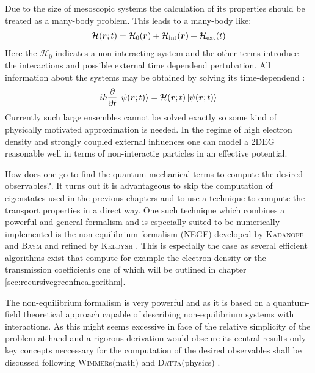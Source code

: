 Due to the size of mesoscopic systems the calculation of its properties should be treated as a many-body problem. This leads to a many-body \hamil{} like:
\begin{align}
\mathcal{H}(\boldsymbol{r};t) = \mathcal{H}_0(\boldsymbol{r}) + \mathcal{H}_{\text{int}}(\boldsymbol{r})+\mathcal{H}_{\text{ext}}(t)
\end{align}
Here the $\mathcal{H}_0$ indicates a non-interacting system and the other terms introduce the interactions and possible external time dependend pertubation. 
All information about the systems may be obtained by solving its time-dependend \sdg{}:
\begin{align}
i\hbar \frac{\partial }{\partial t} \left| \psi(\boldsymbol{r};t) \right> = \mathcal{H}(\boldsymbol{r};t) \left| \psi(\boldsymbol{r};t) \right>
\label{eqn:timedependendsdg}
\end{align}
Currently such large ensembles cannot be solved exactly so some kind of physically motivated approximation is needed. In the regime of high electron density and strongly coupled external influences one can model a 2DEG reasonable well in terms of non-interactig particles in an effective potential\cite{fetter2003quantum}. \par
How does one go to find the quantum mechanical terms to compute the desired observables?. It turns out it is advantageous to skip the computation of eigenstates used in the previous chapters and to use a technique to compute the transport properties in a direct way. One such technique which combines a powerful and general formalism and is especially suited to be numerically implemented is the non-equilibrium \gfnc{} formalism (NEGF) developed by \textsc{Kadanoff} and \textsc{Baym} \cite{kadanoff1962quantum} and refined by \textsc{Keldysh} \cite{keldysh1965}. This is especially the case as several efficient algorithms exist that compute for example the electron density or the transmission coefficients one of which will be outlined in chapter \ref{sec:recursivegreenfncalgorithm}.\par
The non-equilibrium \gfnc{} formalism is very powerful and as it is based on a quantum-field theoretical approach capable of describing non-equilibrium systems with interactions. As this might seems excessive in face of the relative simplicity of the problem at hand and a rigorous derivation would obscure its central results only key concepts neccessary for the computation of the desired observables shall be discussed following \textsc{Wimmer}s(math) \cite{Wimmer2009Thesis} and \textsc{Datta}(physics) \cite{Datta1997}.\par
